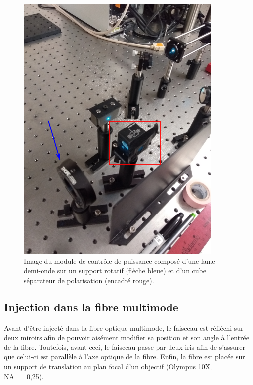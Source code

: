 \documentclass{article}       %
\begin{document}
\begin{figure}[H]
    \centering
    \includegraphics[scale=0.75]{fig/ControlePuissanceMod.PNG}
    \caption{Image du module de contrôle de puissance composé d'une lame demi-onde sur un support rotatif (flèche bleue) et d'un cube séparateur de polarisation (encadré rouge).}
    \label{Fig:ContPuiss}
\end{figure}

\subsection{Injection dans la fibre multimode}

Avant d'être injecté dans la fibre optique multimode, le faisceau est réfléchi sur deux miroirs afin de pouvoir aisément modifier sa position et son angle à l'entrée de la fibre. Toutefois, avant ceci, le faisceau passe par deux iris afin de s'assurer que celui-ci est parallèle à l'axe optique de la fibre. Enfin, la fibre est placée sur un support de translation au plan focal d'un objectif (Olympus 10X, NA~=~0,25).
\end{document}
